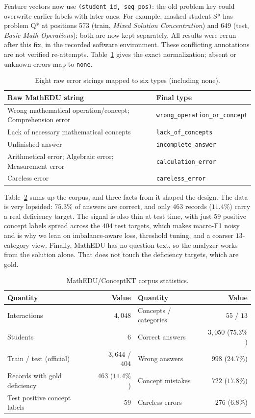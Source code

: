 \documentclass[11pt]{article}
\newcommand{\code}[1]{\texttt{\small #1}}
\begin{document}
Feature vectors now use \code{(student\_id, seq\_pos)}: the old problem key
could overwrite earlier labels with later ones. For example, masked student S* has
problem Q* at positions 573 (train, \emph{Mixed Solution Concentration}) and 649
(test, \emph{Basic Math Operations}); both are now kept separately. All results were
rerun after this fix, in the recorded software environment. These conflicting
annotations are not verified re-attempts. Table~\ref{tab:mapping} gives the exact
normalization; absent or unknown errors map to \code{none}.
\begin{table}[tb]\centering\small
\caption{Eight raw error strings mapped to six types (including none).}\label{tab:mapping}
\begin{tabular}{@{}ll@{}}\toprule
Raw MathEDU string & Final type\\\midrule
Wrong mathematical operation/concept; Comprehension error & \code{wrong\_operation\_or\_concept}\\
Lack of necessary mathematical concepts & \code{lack\_of\_concepts}\\
Unfinished answer & \code{incomplete\_answer}\\
Arithmetical error; Algebraic error; Measurement error & \code{calculation\_error}\\
Careless error & \code{careless\_error}\\\bottomrule
\end{tabular}\end{table}


Table~\ref{tab:data} sums up the corpus, and three facts from it shaped the design.
The data is very lopsided: $75.3\%$ of answers are correct, and only $463$ records
($11.4\%$) carry a real deficiency target. The signal is also thin at test time, with
just $59$ positive concept labels spread across the $404$ test targets, which makes
macro-F1 noisy and is why we lean on imbalance-aware loss, threshold tuning, and a
coarser $13$-category view. Finally, MathEDU has no question text, so the analyzer works
from the solution alone. That does not touch the deficiency targets, which are gold.

\begin{table}[t]
\centering
\caption{MathEDU/ConceptKT corpus statistics.}
\label{tab:data}
\small
\begin{tabular}{@{}lr@{\hspace{2.2em}}lr@{}}
\toprule
\textbf{Quantity} & \textbf{Value} & \textbf{Quantity} & \textbf{Value}\\
\midrule
Interactions            & $4{,}048$ & Concepts / categories      & $55$ / $13$\\
Students                & $6$       & Correct answers            & $3{,}050$ ($75.3\%$)\\
Train / test (official) & $3{,}644$ / $404$ & Wrong answers      & $998$ ($24.7\%$)\\
Records with gold deficiency & $463$ ($11.4\%$) & Concept mistakes & $722$ ($17.8\%$)\\
Test positive concept labels & $59$  & Careless errors            & $276$ ($6.8\%$)\\
\bottomrule
\end{tabular}
\end{table}
\end{document}
